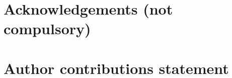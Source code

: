 \documentclass[fleqn,10pt]{wlscirep}
\begin{document}





\newpage


\section*{Acknowledgements (not compulsory)}

\section*{Author contributions statement}
\end{document}
